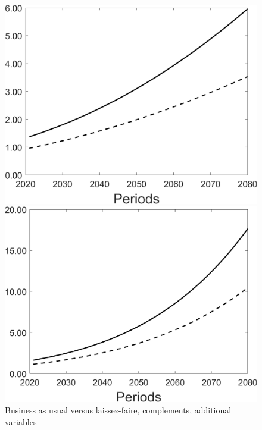 \begin{figure}[h!!]
	\centering
	\caption{Business as usual versus laissez-faire, complements, additional variables }\label{fig:onlyBAU_comp_add}
		\begin{minipage}[]{0.32\textwidth}
		\includegraphics[width=1\textwidth]{../../codding_model/Own/figures/Rep_agent/staticBAU_LF_separate_yc_periods59_eppsilon0.40_zeta1.40_Ad08_Ac04_thetac0.70_thetad0.56_HetGrowth1_tauul0.181_util0_withtarget0_lgd0.png}
	\end{minipage}
	\begin{minipage}[]{0.32\textwidth}
		\includegraphics[width=1\textwidth]{../../codding_model/Own/figures/Rep_agent/staticBAU_LF_separate_yd_periods59_eppsilon0.40_zeta1.40_Ad08_Ac04_thetac0.70_thetad0.56_HetGrowth1_tauul0.181_util0_withtarget0_lgd0.png}

\end{minipage}
\end{figure}
